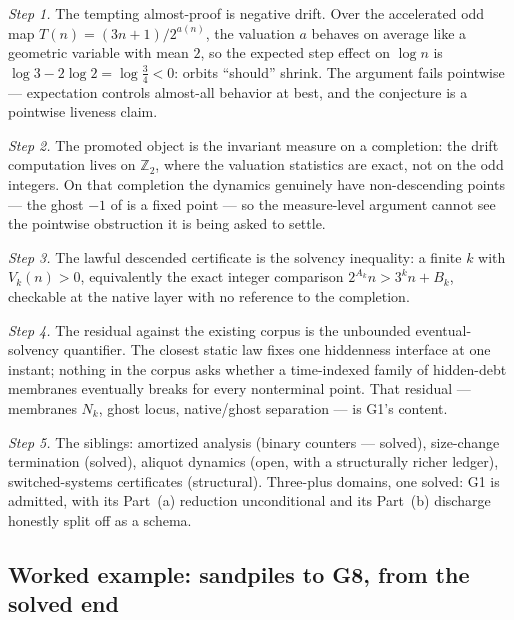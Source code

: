 \documentclass[11pt]{article}
\theoremstyle{definition}
\begin{document}
\emph{Step 1.} The tempting almost-proof is negative drift. Over the accelerated odd map
$T(n) = (3n+1)/2^{a(n)}$, the valuation $a$ behaves on average like a geometric variable with mean
$2$, so the expected step effect on $\log n$ is $\log 3 - 2 \log 2 = \log \tfrac34 < 0$: orbits
``should'' shrink. The argument fails pointwise --- expectation controls almost-all behavior at best,
and the conjecture is a pointwise liveness claim.

\emph{Step 2.} The promoted object is the invariant measure on a completion: the drift computation
lives on $\mathbb{Z}_2$, where the valuation statistics are exact, not on the odd integers. On that
completion the dynamics genuinely have non-descending points --- the ghost $-1$ of
 is a fixed point --- so the measure-level argument cannot see the pointwise
obstruction it is being asked to settle.

\emph{Step 3.} The lawful descended certificate is the solvency inequality: a finite $k$ with
$V_k(n) > 0$, equivalently the exact integer comparison $2^{A_k} n > 3^k n + B_k$, checkable at the
native layer with no reference to the completion.

\emph{Step 4.} The residual against the existing corpus is the unbounded eventual-solvency
quantifier. The closest static law fixes one hiddenness interface at one instant; nothing in the
corpus asks whether a time-indexed family of hidden-debt membranes eventually breaks for every
nonterminal point. That residual --- membranes $N_k$, ghost locus, native/ghost separation --- is
G1's content.

\emph{Step 5.} The siblings: amortized analysis (binary counters --- solved), size-change
termination (solved), aliquot dynamics (open, with a structurally richer ledger), switched-systems
certificates (structural). Three-plus domains, one solved: G1 is admitted, with its Part~(a)
reduction unconditional and its Part~(b) discharge honestly split off as a schema.

\subsection*{Worked example: sandpiles to G8, from the solved end}
\end{document}
